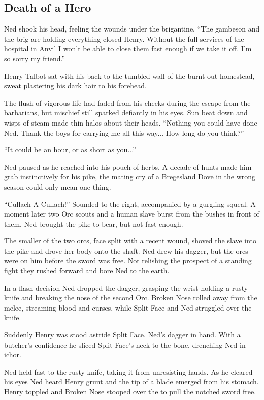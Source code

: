 \subsection{Death of a Hero}
Ned shook his head, feeling the wounds under the brigantine. “The gambeson and the brig are holding everything closed Henry. Without the full services of the hospital in Anvil I won't be able to close them fast enough if we take it off. I'm so sorry my friend.”

Henry Talbot sat with his back to the tumbled wall of the burnt out homestead, sweat plastering his dark hair to his forehead.

The flush of vigorous life had faded from his cheeks during the escape from the barbarians, but mischief still sparked defiantly in his eyes. Sun beat down and wisps of steam made thin halos about their heads. “Nothing you could have done Ned. Thank the boys for carrying me all this way... How long do you think?”

“It could be an hour, or as short as you...”

Ned paused as he reached into his pouch of herbs. A decade of hunts made him grab instinctively for his pike, the mating cry of a Bregesland Dove in the wrong season could only mean one thing.

“Cullach-A-Cullach!” Sounded to the right, accompanied by a gurgling squeal. A moment later two Orc scouts and a human slave burst from the bushes in front of them. Ned brought the pike to bear, but not fast enough.

The smaller of the two orcs, face split with a recent wound, shoved the slave into the pike and drove her body onto the shaft. Ned drew his dagger, but the orcs were on him before the sword was free. Not relishing the prospect of a standing fight they rushed forward and bore Ned to the earth.

In a flash decision Ned dropped the dagger, grasping the wrist holding a rusty knife and breaking the nose of the second Orc. Broken Nose rolled away from the melee, streaming blood and curses, while Split Face and Ned struggled over the knife.

Suddenly Henry was stood astride Split Face, Ned's dagger in hand. With a butcher's confidence he sliced Split Face's neck to the bone, drenching Ned in ichor.

Ned held fast to the rusty knife, taking it from unresisting hands. As he cleared his eyes Ned heard Henry grunt and the tip of a blade emerged from his stomach. Henry toppled and Broken Nose stooped over the to pull the notched sword free.

